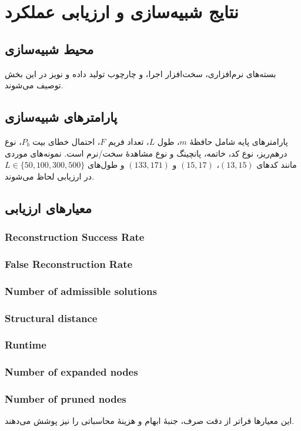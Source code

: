 \chapter{نتایج شبیه‌سازی و ارزیابی عملکرد}
\label{chap:results}

\section{محیط شبیه‌سازی}
بسته‌های نرم‌افزاری، سخت‌افزار اجرا، و چارچوب تولید داده و نویز در این بخش توصیف می‌شوند.

\section{پارامترهای شبیه‌سازی}
پارامترهای پایه شامل حافظهٔ \(m\)، طول \(L\)، تعداد فریم \(F\)، احتمال خطای بیت \(P_b\)، نوع درهم‌ریز، نوع کد، خاتمه، پانچینگ و نوع مشاهدهٔ سخت/نرم است. نمونه‌های موردی مانند کدهای \((13,15)\)، \((15,17)\) و \((133,171)\) و طول‌های \(L\in\{50,100,300,500\}\) در ارزیابی لحاظ می‌شوند.

\section{معیارهای ارزیابی}
\subsection{Reconstruction Success Rate}
\subsection{False Reconstruction Rate}
\subsection{Number of admissible solutions}
\subsection{Structural distance}
\subsection{Runtime}
\subsection{Number of expanded nodes}
\subsection{Number of pruned nodes}
این معیارها فراتر از دقت صرف، جنبهٔ ابهام و هزینهٔ محاسباتی را نیز پوشش می‌دهند.


